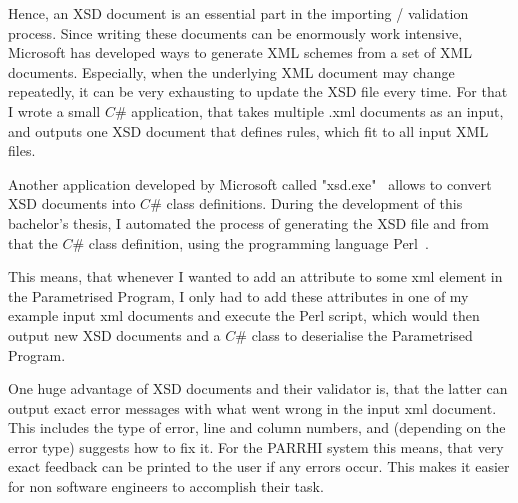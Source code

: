 Hence, an XSD document is an essential part in the importing / validation process. Since writing these documents can be enormously work intensive, Microsoft has developed ways to generate XML schemes from a set of XML documents. Especially, when the underlying XML document may change repeatedly, it can be very exhausting to update the XSD file every time. For that I wrote a small $C\#$ application, that takes multiple .xml documents as an input, and outputs one XSD document that defines rules, which fit to all input XML files. 

Another application developed by Microsoft called "xsd.exe"~\cite{xsdExe} allows to convert XSD documents into $C\#$ class definitions. During the development of this bachelor's thesis, I automated the process of generating the XSD file and from that the $C\#$ class definition, using the programming language Perl~\cite{perl}.

This means, that whenever I wanted to add an attribute to some xml element in the Parametrised Program, I only had to add these attributes in one of my example input xml documents and execute the Perl script, which would then output new XSD documents and a $C\#$ class to deserialise the Parametrised Program. 

One huge advantage of XSD documents and their validator is, that the latter can output exact error messages with what went wrong in the input xml document. This includes the type of error, line and column numbers, and (depending on the error type) suggests how to fix it. For the PARRHI system this means, that very exact feedback can be printed to the user if any errors occur. This makes it easier for non software engineers to accomplish their task.




















